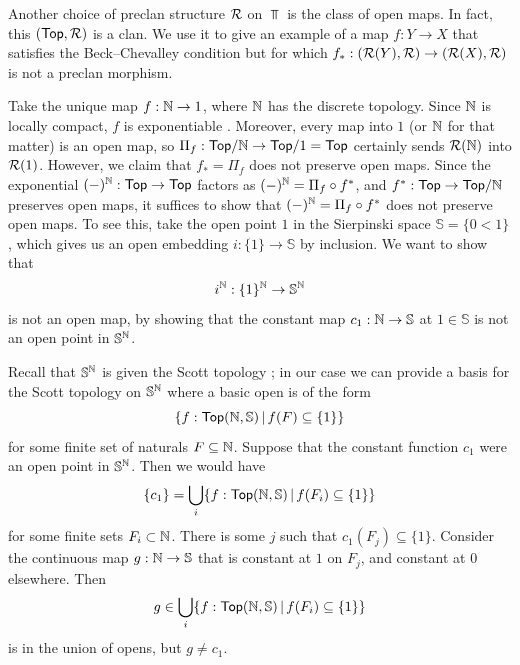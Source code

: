 \begin{example}
  \label{ex:top-open-maps}
  Another choice of preclan structure $\mathcal{R}$ on $\Top$
  is the class of open maps.
  In fact, this $(\mathsf{Top}, \mathcal{R})$ is a clan.
  We use it to give an example of
  a map $f : Y \to X$ that satisfies the Beck--Chevalley condition
  but for which $f_* : (\mathcal{R}(Y), \mathcal{R}) \to (\mathcal{R}(X), \mathcal{R})$ is not a preclan morphism.

  Take the unique map $f : \mathbb{N} \to 1$,
  where $\mathbb{N}$ has the discrete topology.
  Since $\mathbb{N}$ is locally compact, $f$ is exponentiable \cite{niefield1982}.
  Moreover, every map into $1$ (or $\mathbb{N}$ for that matter) is an open map,
  so $\Pi_f : \mathsf{Top}/\mathbb{N} \to \mathsf{Top}/1 = \mathsf{Top}$ certainly sends $\mathcal{R}(\mathbb{N})$ into $\mathcal{R}(1)$.
  However, we claim that $f_* = \Pi_f$ does not preserve open maps.
  Since the exponential $(-)^{\mathbb{N}} : \mathsf{Top} \to \mathsf{Top}$
  factors as $(-)^{\mathbb{N}} = \Pi_f \circ f^*$,
  and $f^* : \mathsf{Top} \to \mathsf{Top} / \mathbb{N}$ preserves open maps,
  it suffices to show that
  $(-)^{\mathbb{N}} = \Pi_f \circ f^*$ does not preserve open maps.
  To see this,
  take the open point $1$ in the Sierpinski space $\mathbb{S} = \{0 < 1\}$,
  which gives us an open embedding $i : \{1\} \to \mathbb{S}$ by inclusion.
  We want to show that \[i^{\mathbb{N}} : \{1\}^{\mathbb{N}} \to \mathbb{S}^{\mathbb{N}}\]
  is not an open map,
  by showing that the constant map $c_1 : \mathbb{N} \to \mathbb{S}$
  at $1 \in \mathbb{S}$
  is not an open point in $\mathbb{S}^{\mathbb{N}}$.

  Recall that $\mathbb{S}^{\mathbb{N}}$ is given the Scott topology \cite{niefield1982};
  in our case we can provide a basis for the Scott topology on $\mathbb{S}^{\mathbb{N}}$
  where a basic open is of the form 
  \[\{f : \mathsf{Top}(\mathbb{N},\mathbb{S}) \,|\, f(F) \subseteq \{1\} \}\]
  for some finite set of naturals $F \subseteq \mathbb{N}$.
  Suppose that the constant function $c_1$ were an open point in $\mathbb{S}^{\mathbb{N}}$.
  Then we would have
  \[ \{c_1\} = \bigcup_{i} \{f : \mathsf{Top}(\mathbb{N},\mathbb{S}) \,|\, f(F_i) \subseteq \{1\} \}\]
  for some finite sets $F_i \subset \mathbb{N}$.
  There is some $j$ such that $c_1 (F_j) \subseteq \{1\}$.
  Consider the continuous map $g : \mathbb{N} \to \mathbb{S}$ that is constant at $1$
  on $F_j$, and constant at $0$ elsewhere.
  Then 
  \[g \in \bigcup_{i} \{f : \mathsf{Top}(\mathbb{N},\mathbb{S}) \,|\, f(F_i) \subseteq \{1\} \}\]
  is in the union of opens, but $g \ne c_1$.
\end{example}

